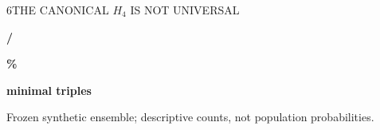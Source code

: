 {\begin{minipage}[t][\PosterMiddleRowHeight][t]{\PosterHalfWidth}
\begin{PosterPanel}{\PosterMiddleRowHeight}{6}{THE CANONICAL $H_4$ IS NOT UNIVERSAL}
\begin{minipage}[t]{135mm}
    \end{minipage}\hspace{3mm}%
    \begin{minipage}[t]{135mm}\centering\vspace{0pt}
      \colorbox{IASPaleGold}{\parbox[c][58mm][c]{129mm}{\centering
        {\MetricSize\bfseries\color{IASGold!70!black}\NumAlternativeWitnessScenarios/\NumValidMC\par}
        {\HeroEquation\bfseries\color{IASGold!70!black}\AlternativeWitnessPercent\%\par}
        {\TableSize\bfseries\color{IASDarkText}minimal triples\par}}}
    \end{minipage}\par
    {\FigureSize\color{IASGray}Frozen synthetic ensemble; descriptive counts, not population probabilities.}
  \end{PosterPanel}
\end{minipage}%
}%
\ifdefined\PosterFull
  \PosterSectionContent
  \let\PosterSectionFinish\relax
\else
  \def\PosterPageWidth{\PosterPreviewHalfPageWidth}
  \def\PosterPageHeight{\PosterPreviewMiddlePageHeight}
  \def\PosterPreviewLeft{\PosterPreviewHalfLeft}
  
  \begin{frame}[t]
  \vspace*{\PosterPreviewTop}
  \noindent\hspace*{\PosterPreviewLeft}%
  \PosterSectionContent
  \end{frame}
  \def\PosterSectionFinish{}
\fi
\PosterSectionFinish
